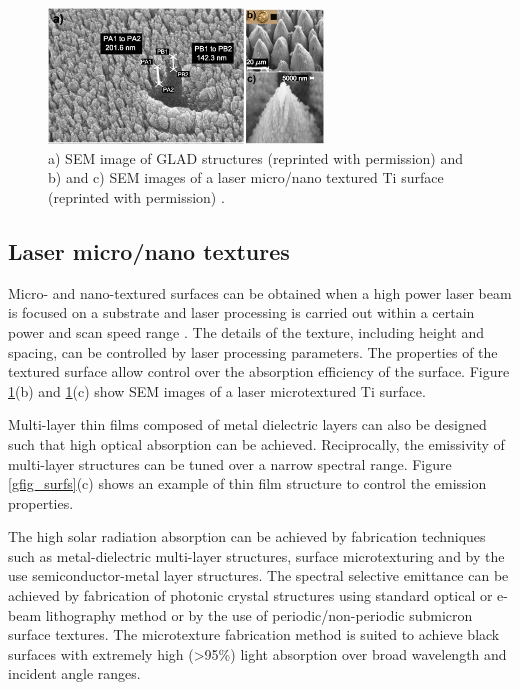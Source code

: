 \documentclass[review]{elsarticle}
\begin{document}
\begin{figure}[ht!]
	\includegraphics[width=0.65\textwidth]{gfig45_comb}
	\caption{\label{gfig45_comb} a) SEM image of GLAD structures (reprinted with permission) \cite{gfig4ref} and b) and c) SEM images of a laser micro/nano textured Ti surface (reprinted with permission) \cite{g28}.} %
\end{figure} 

\subsection{Laser micro/nano textures}
Micro- and nano-textured surfaces can be obtained when a high power laser beam is 
focused on a substrate and laser processing is carried out within a certain power 
and scan speed range \cite{g28}.  The details of the texture, including height and spacing, can be controlled by laser processing parameters.  The properties of the textured surface allow control over the absorption efficiency of the surface. Figure \ref{gfig45_comb}(b) and \ref{gfig45_comb}(c) show SEM images of a laser microtextured Ti surface. 

Multi-layer thin films composed of metal dielectric layers can also be designed such that high optical absorption can be achieved.  Reciprocally, the emissivity of multi-layer structures can be tuned over a narrow spectral range. Figure \ref{gfig_surfs}(c) shows an example of thin film structure to control the emission properties. 

The high solar radiation absorption can be achieved by fabrication techniques such as metal-dielectric multi-layer structures, surface microtexturing and by the use semiconductor-metal layer structures. The spectral selective emittance can be achieved by fabrication of photonic crystal structures using standard optical or e-beam lithography method or by the use of periodic/non-periodic submicron surface textures.  The microtexture fabrication method is suited to achieve black surfaces with extremely high (\textgreater95\%) light absorption over broad wavelength and incident angle ranges.
\end{document}
